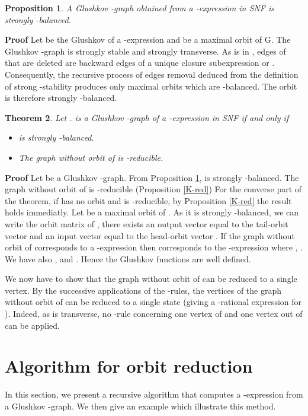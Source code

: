 \documentclass[11pt]{article}
\newtheorem{theorem}{Theorem}
\newtheorem{proposition}[theorem]{Proposition}
\begin{document}
\begin{proposition}\label{K-prop}
A Glushkov -graph obtained from a -expression  in SNF is strongly -balanced.
\end{proposition}
{\bf Proof }
Let  be the Glushkov of a -expression  and  be a maximal orbit of G. The Glushkov -graph  is strongly stable and strongly transverse. As  is in , edges of  that are deleted are backward edges of a unique closure subexpression  or . Consequently, the recursive process of edges removal deduced from the definition of strong -stability produces only maximal orbits which are -balanced. The orbit  is therefore strongly -balanced.
\cqfd

\begin{theorem}
Let .  is a Glushkov -graph of a -expression  in SNF if and only if
\begin{itemize}
\item  is strongly -balanced.
\item The graph without orbit of  is -reducible.
\end{itemize}
\end{theorem}
{\bf Proof } Let  be a Glushkov -graph. From Proposition \ref{K-prop},  is strongly -balanced. The graph without orbit of  is -reducible (Proposition \ref{K-red})
For the converse part of the theorem, if  has no orbit and  is -reducible, by Proposition  \ref{K-red} the result holds immediatly. Let  be a maximal orbit of . As it is strongly -balanced, we can write  the orbit matrix of , there exists an output vector  equal to the tail-orbit vector  and an input vector  equal to the head-orbit vector . If the graph without orbit of  corresponds to a -expression  then  corresponds to the -expression  where ,  . We have also ,  and . Hence the Glushkov functions are well defined. 

We now have to show that the graph without orbit of  can be reduced to a single vertex. By the successive applications of the -rules, the vertices of the graph without orbit of  can be reduced to a single state (giving a -rational expression for ). Indeed, as  is transverse, no -rule concerning one vertex of  and one vertex out of  can be applied. 

\cqfd

\section{Algorithm for orbit reduction}
In this section, we present a recursive algorithm that computes a -expression from a Glushkov -graph. We then give an example which illustrate this method.
\end{document}
